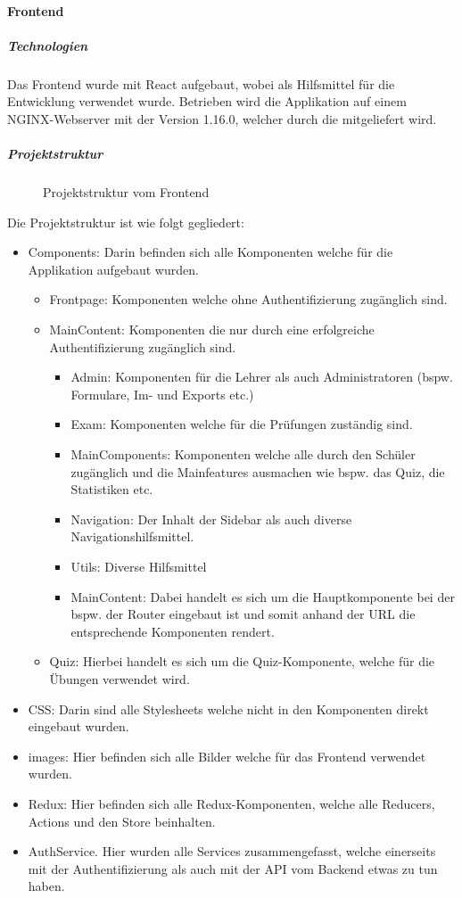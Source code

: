 \paragraph{Frontend}
\subparagraph{Technologien}
Das Frontend wurde mit React aufgebaut, wobei als Hilfsmittel \cite{create-react-app} für die Entwicklung verwendet wurde.
Betrieben wird die Applikation auf einem NGINX-Webserver mit der Version 1.16.0, welcher durch die \cite{create-react-app} mitgeliefert wird.
\subparagraph{Projektstruktur}
\begin{wrapfigure}{r}{5.5cm}
    \caption{Projektstruktur vom Frontend}\label{img: reactprojectstructure}
\end{wrapfigure}
Die Projektstruktur ist wie folgt gegliedert:
\begin{itemize}
    \item Components: Darin befinden sich alle Komponenten welche für die Applikation aufgebaut wurden.
    \begin{itemize}
        \item Frontpage: Komponenten welche ohne Authentifizierung zugänglich sind.
        \item MainContent: Komponenten die nur durch eine erfolgreiche Authentifizierung zugänglich sind.
        \begin{itemize}
            \item Admin: Komponenten für die Lehrer als auch Administratoren (bspw. Formulare, Im- und Exports etc.)
            \item Exam: Komponenten welche für die Prüfungen zuständig sind.
            \item MainComponents: Komponenten welche alle durch den Schüler zugänglich und die Mainfeatures ausmachen wie bspw. das Quiz, die Statistiken etc.
            \item Navigation: Der Inhalt der Sidebar als auch diverse Navigationshilfsmittel.
            \item Utils: Diverse Hilfsmittel
            \item MainContent: Dabei handelt es sich um die Hauptkomponente bei der bspw. der Router eingebaut ist und somit anhand der URL die entsprechende Komponenten rendert.
        \end{itemize}
        \item Quiz: Hierbei handelt es sich um die Quiz-Komponente, welche für die Übungen verwendet wird.
    \end{itemize}
    \item CSS: Darin sind alle Stylesheets welche nicht in den Komponenten direkt eingebaut wurden.
    \item images: Hier befinden sich alle Bilder welche für das Frontend verwendet wurden.
    \item Redux: Hier befinden sich alle Redux-Komponenten, welche alle Reducers, Actions und den Store beinhalten.
    \item AuthService. Hier wurden alle Services zusammengefasst, welche einerseits mit der Authentifizierung als auch mit der API vom Backend etwas zu tun haben.
\end{itemize}
